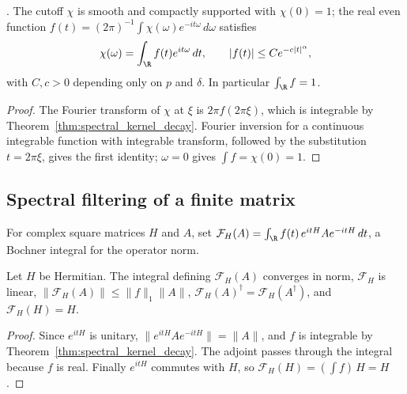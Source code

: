 \begin{theorem}
    \label{thm:quasilocal_filter}
    \leanok
    \cite[Lemma~4.2]{OpenAI2026AreaLaw}.
    The cutoff $\chi$ is smooth and compactly supported with $\chi(0)=1$; the
    real even function $f(t)=(2\pi)^{-1}\int\chi(\omega)e^{-it\omega}\,d\omega$
    satisfies
    \[
        \chi(\omega)=\int_{\R} f(t)e^{it\omega}\,dt,\qquad
        |f(t)|\le Ce^{-c|t|^\alpha},
    \]
    with $C,c>0$ depending only on $p$ and $\delta$. In particular
    $\int_{\R} f=1$.
\end{theorem}
\begin{proof}\leanok
    The Fourier transform of $\chi$ at $\xi$ is $2\pi f(2\pi\xi)$, which is
    integrable by Theorem~\ref{thm:spectral_kernel_decay}. Fourier inversion
    for a continuous integrable function with integrable transform, followed
    by the substitution $t=2\pi\xi$, gives the first identity; $\omega=0$
    gives $\int f=\chi(0)=1$.
\end{proof}

\subsection{Spectral filtering of a finite matrix}
\label{sec:spectral_filter_matrix}

\begin{definition}
    \label{def:filter_integral}
    \leanok
    For complex square matrices $H$ and $A$, set
    $\mathcal F_H(A)=\int_{\R} f(t)\,e^{itH}Ae^{-itH}\,dt$, a Bochner integral
    for the operator norm.
\end{definition}

\begin{theorem}
    \label{thm:filter_integral_basic}
    \leanok
    Let $H$ be Hermitian. The integral defining $\mathcal F_H(A)$ converges in
    norm, $\mathcal F_H$ is linear, $\|\mathcal F_H(A)\|\le\|f\|_1\|A\|$,
    $\mathcal F_H(A)^\dagger=\mathcal F_H(A^\dagger)$, and
    $\mathcal F_H(H)=H$.
\end{theorem}
\begin{proof}\leanok
    Since $e^{itH}$ is unitary, $\|e^{itH}Ae^{-itH}\|=\|A\|$, and
    $f$ is integrable by Theorem~\ref{thm:spectral_kernel_decay}. The adjoint
    passes through the integral because $f$ is real. Finally $e^{itH}$
    commutes with $H$, so $\mathcal F_H(H)=(\int f)\,H=H$.
\end{proof}

